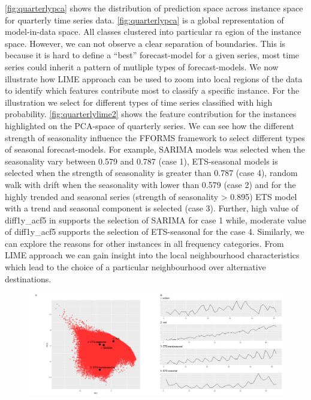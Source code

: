 \documentclass[11pt,a4paper,]{article}
\begin{document}
\autoref{fig:quarterlypca} shows the distribution of prediction space
across instance space for quarterly time series data.
\autoref{fig:quarterlypca} is a global representation of model-in-data
space. All classes clustered into particular ra egion of the instance
space. However, we can not observe a clear separation of boundaries.
This is because it is hard to define a ``best'' forecast-model for a
given series, most time series could inherit a pattern of mutliple types
of forecast-models. We now illustrate how LIME approach can be used to
zoom into local regions of the data to identify which features
contribute most to classify a specific instance. For the illustration we
select for different types of time series classified with high
probability. \autoref{fig:quarterlylime2} shows the feature contribution
for the instances highlighted on the PCA-space of quarterly series. We
can see how the different strength of seasonality influence the FFORMS
framework to select different types of seasonal forecast-models. For
example, SARIMA models was selected when the seasonality vary between
0.579 and 0.787 (case 1), ETS-seasonal models is selected when the
strength of seasonality is greater than 0.787 (case 4), random walk with
drift when the seasonality with lower than 0.579 (case 2) and for the
highly trended and seasonal series (strength of seasonality
\textgreater{} 0.895) ETS model with a trend and seasonal component is
selected (case 3). Further, high value of diff1y\_acf5 in supports the
selection of SARIMA for case 1 while, moderate value of diff1y\_acf5
supports the selection of ETS-seasonal for the case 4. Similarly, we can
explore the reasons for other instances in all frequency categories.
From LIME approach we can gain insight into the local neighbourhood
characteristics which lead to the choice of a particular neighbourhood
over alternative destinations.

\begin{figure}[h]

{\centering \includegraphics{figures/quarterlylime-1} 

}

\end{figure}
\end{document}

